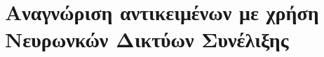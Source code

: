 \section{Αναγνώριση αντικειμένων με χρήση Νευρωνκών Δικτύων Συνέλιξης}
\label{sec:theory_object_recognition}

